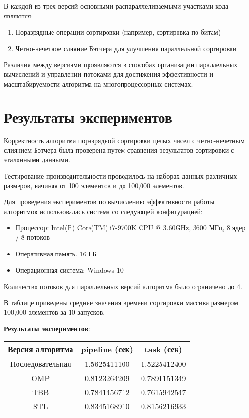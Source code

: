 \documentclass{report}
\begin{document}
В каждой из трех версий основными распараллеливаемыми участками кода являются:
\begin{enumerate}
\item Поразрядные операции сортировки (например, сортировка по битам)
\item Четно-нечетное слияние Бэтчера для улучшения параллельной сортировки
\end{enumerate}

Различия между версиями проявляются в способах организации параллельных вычислений и управлении потоками для достижения эффективности и масштабируемости алгоритма на многопроцессорных системах.

\newpage

\section*{Результаты экспериментов}
\par Корректность алгоритма поразрядной сортировки целых чисел с четно-нечетным слиянием Бэтчера была проверена путем сравнения результатов сортировки с эталонными данными.
\par Тестирование производительности проводилось на наборах данных различных размеров, начиная от 100 элементов и до 100,000 элементов.
\par Для проведения экспериментов по вычислению эффективности работы алгоритмов использовалась система со следующей конфигурацией:
\begin{itemize}
\item Процессор: Intel(R) Core(TM) i7-9700K CPU @ 3.60GHz, 3600 МГц, 8 ядер / 8 потоков
\item Оперативная память: 16 ГБ
\item Операционная система: Windows 10
\end{itemize}
\par Количество потоков для параллельных версий алгоритма было ограничено до 4.
\par В таблице приведены средние значения времени сортировки массива размером 100,000 элементов за 10 запусков.
\par \textbf{Результаты экспериментов:}
\begin{center}
\begin{tabular}{ ||c | c | c ||  }
    \hline Версия алгоритма & pipeline (сек) & task (сек)\\ 
    \hline Последовательная & 1.5625411100 & 1.5225412400 \\
    \hline OMP & 0.8123264209 & 0.7891151349 \\
    \hline TBB & 0.7841456712 & 0.7615942547 \\ 
    \hline STL & 0.8345168910 & 0.8156216933 \\ 
    \hline
\end{tabular}\\[5mm]
\end{center}
\end{document}
